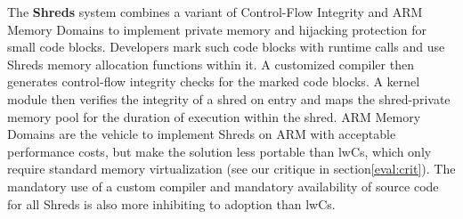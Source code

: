 \documentclass[10pt,twocolumn,letter]{article}
\begin{document}
The \textbf{Shreds} system combines a variant of Control-Flow Integrity and ARM Memory Domains to implement private memory and hijacking protection for small code blocks.
Developers mark such code blocks with runtime calls and use Shreds memory allocation functions within it.
A customized compiler then generates control-flow integrity checks for the marked code blocks.
A kernel module then verifies the integrity of a shred on entry and maps the shred-private memory pool for the duration of execution within the shred.
ARM Memory Domains are the vehicle to implement Shreds on ARM with acceptable performance costs, but make the solution less portable than lwCs, which only require standard memory virtualization (see our critique in section\ref{eval:crit}).
The mandatory use of a custom compiler and mandatory availability of source code for all Shreds is also more inhibiting to adoption than lwCs.
\cite{chen2016shreds,abadi2009control,armmemorydomains}

  
  
\end{document}
